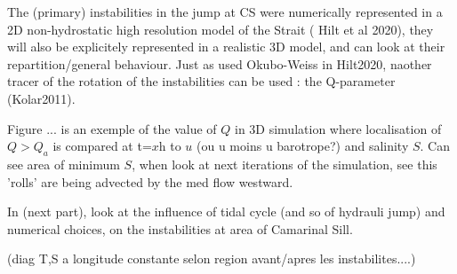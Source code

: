 The (primary) instabilities in the jump at CS were numerically represented in a 2D non-hydrostatic high resolution model of the Strait ( Hilt et al 2020), they will also be explicitely represented in a realistic 3D model, and can look at their repartition/general behaviour. Just as used Okubo-Weiss in Hilt2020, naother tracer of the rotation of the instabilities can be used : the Q-parameter (Kolar2011).

Figure ... is an exemple of the value of $Q$ in 3D simulation where localisation of $Q>Q_a$ is compared at t=$x$h to $u$ (ou u moins u barotrope?) and salinity $S$. Can see area of minimum $S$, when look at next iterations of the simulation, see this 'rolls' are being advected by the med flow westward. 







In (next part), look at the influence of tidal cycle (and so of hydrauli jump) and numerical choices, on the instabilities at area of Camarinal Sill.

(diag T,S a longitude constante selon region avant/apres les instabilites....)







